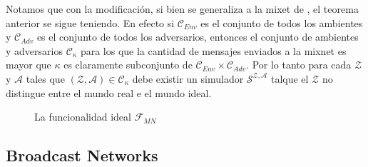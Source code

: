Notamos que con la modificación, si bien se generaliza a la mixet de \cite{Wikstrom04a}, el teorema anterior
se sigue teniendo. En efecto si $\mathcal{C}_{Env}$ es el conjunto
de todos los ambientes y $\mathcal{C}_{Adv}$ es el conjunto de todos los adversarios, entonces el conjunto
de ambientes y adversarios $\mathcal{C}_{\kappa}$ para los que la cantidad de mensajes enviados a la mixnet
es mayor que $\kappa$ es claramente subconjunto de $\mathcal{C}_{Env}\times\mathcal{C}_{Adv}$. Por lo tanto
para cada $\mathcal{Z}$ y $\mathcal{A}$ tales que $(\mathcal{Z}, \mathcal{A}) \in \mathcal{C}_\kappa$ debe
existir un simulador $\mathcal{S^{Z, A}}$ talque el $\mathcal{Z}$ no distingue entre el mundo real e el
mundo ideal.

\begin{figure}
\begin{centering}
\end{centering}
\caption{La funcionalidad ideal $\mathcal{F}_{MN}$}
\label{func:F_MN}
\end{figure}

\subsection{Broadcast Networks}

